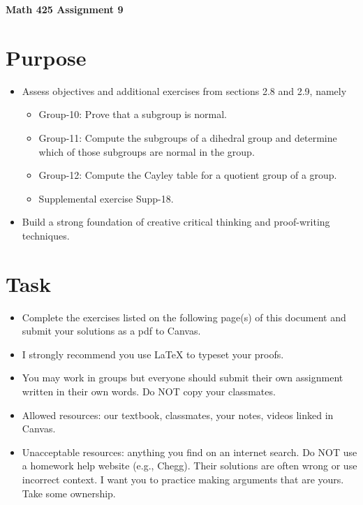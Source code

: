 \documentclass[12pt]{article}
\begin{document}
	\begin{center}
		{\Large \bf Math 425 Assignment 9}
	\end{center}
	\section*{Purpose}
	\begin{itemize}
		\item Assess objectives and additional exercises from sections 2.8 and 2.9, namely
		\begin{itemize}
			\item Group-10:	Prove that a subgroup is normal.
			\item Group-11:	Compute the subgroups of a dihedral group and determine which of those subgroups are normal in the group.
			\item Group-12:	Compute the Cayley table for a quotient group of a group.
			\item Supplemental exercise Supp-18.
		\end{itemize}
		\item Build a strong foundation of creative critical thinking and proof-writing techniques.
	\end{itemize}
	\section*{Task}
	\begin{itemize}
		\item Complete the exercises listed on the following page(s) of this document and submit your solutions as a pdf to Canvas.
		\item I strongly recommend you use LaTeX to typeset your proofs.
		\item You may work in groups but everyone should submit their own assignment written in their own words.  Do NOT copy your classmates.
		\item Allowed resources: our textbook, classmates, your notes, videos linked in Canvas.
		\item Unacceptable resources: anything you find on an internet search. Do NOT use a homework help website (e.g., Chegg). Their solutions are often wrong or use incorrect context.  I want you to practice making arguments that are yours. Take some ownership.
	\end{itemize}
\end{document}
